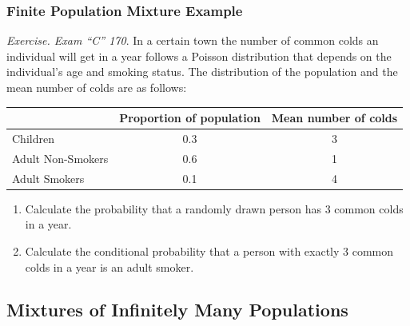 \documentclass[]{book}
\theoremstyle{definition}
\theoremstyle{definition}
\theoremstyle{definition}
\theoremstyle{remark}
\begin{document}
\subsubsection{Finite Population Mixture
Example}\label{finite-population-mixture-example}

\emph{Exercise. Exam ``C'' 170}. In a certain town the number of common
colds an individual will get in a year follows a Poisson distribution
that depends on the individual's age and smoking status. The
distribution of the population and the mean number of colds are as
follows:

\begin{longtable}[]{@{}lcc@{}}
\toprule
\begin{minipage}[b]{0.32\columnwidth}\raggedright\strut
\strut
\end{minipage} & \begin{minipage}[b]{0.32\columnwidth}\centering\strut
Proportion of population\strut
\end{minipage} & \begin{minipage}[b]{0.32\columnwidth}\centering\strut
Mean number of colds\strut
\end{minipage}\tabularnewline
\midrule
\endhead
Children & 0.3 & 3\tabularnewline
Adult Non-Smokers & 0.6 & 1\tabularnewline
Adult Smokers & 0.1 & 4\tabularnewline
\bottomrule
\end{longtable}

\begin{enumerate}
\def\labelenumi{\arabic{enumi}.}
\item
  Calculate the probability that a randomly drawn person has 3 common
  colds in a year.
\item
  Calculate the conditional probability that a person with exactly 3
  common colds in a year is an adult smoker.
\end{enumerate}

\subsection{Mixtures of Infinitely Many
Populations}\label{mixtures-of-infinitely-many-populations}
\end{document}
